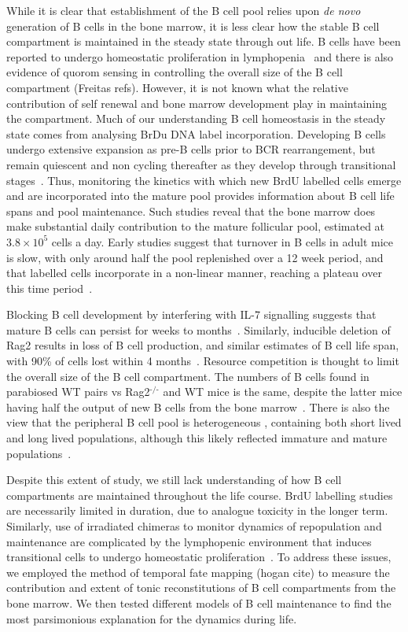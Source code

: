 \documentclass[12pt]{article}
\newcommand{\superscript}[1]{\ensuremath{^{\textrm{#1}}}} %
\newcommand{\red}[1]{{\color{red}{#1}}}
\newcommand{\scinot}[2]{\ensuremath{#1 \times 10^{#2}}}
\begin{document}
While it is clear that establishment of the B cell pool relies upon \textit{de novo} generation of B cells in the bone marrow, it is less clear how the stable B cell compartment is maintained in the steady state through out life. B cells have been reported to undergo homeostatic proliferation in lymphopenia~\citep{MeyerBahlburg:2008bc, Cabatingan:2002fm} and there is also evidence of quorom sensing in controlling the overall size of the B cell compartment (Freitas refs). However, it is not known what the relative contribution of self renewal and bone marrow development play in maintaining the compartment. Much of our understanding B cell homeostasis in the steady state comes from analysing BrDu DNA label incorporation. Developing B cells undergo extensive expansion as pre-B cells prior to BCR rearrangement, but remain quiescent and non cycling thereafter  as they develop through transitional stages~\citep{Srivastava:2005jja}. Thus, monitoring the kinetics with which new BrdU labelled cells emerge and are incorporated into the mature pool provides information about B cell life spans and pool maintenance. Such studies reveal that the bone marrow does make substantial daily contribution to the mature follicular pool, estimated at \scinot{3.8}{5} cells a day. Early studies suggest that turnover in B cells in adult mice is slow, with only around half the pool replenished over a 12 week period, and that labelled cells incorporate in a non-linear manner, reaching a plateau over this time period~\citep{Forster:1990tl, Fulcher:1997dr}. 

Blocking B cell development by interfering with IL-7 signalling suggests that mature B cells can persist for weeks to months~\citep{Grabstein:1993jb}. Similarly, inducible deletion of Rag2 results in loss of B cell production, and similar estimates of B cell life span, with 90\% of cells lost within 4 months~\citep{comp:2001ti}. Resource competition is thought to limit the overall size of the B cell compartment. The numbers of B cells found in parabiosed WT pairs vs Rag2\superscript{-/-} and WT mice is the same, despite the latter mice having half the output of new B cells from the bone marrow~\citep{Agenes:1997hk}. There is also the view that the peripheral B cell pool is heterogeneous \red{isn't this unsurprising since there are multiple subsets?}, containing both short lived and long lived populations, although this likely reflected immature and mature populations~\citep{Fulcher:1997dr}.

Despite this extent of study, we still lack understanding of how B cell compartments are maintained throughout the life course. BrdU labelling studies are necessarily limited in duration, due to analogue toxicity in the longer term. Similarly, use of irradiated chimeras to monitor dynamics of repopulation and maintenance are complicated by the lymphopenic environment that induces transitional cells to undergo homeostatic proliferation~\citep{MeyerBahlburg:2008bc}. To address these issues, we employed the method of temporal fate mapping (hogan cite) to measure the contribution and extent of tonic reconstitutions of B cell compartments from the bone marrow. We then tested different models of B cell maintenance to find the most parsimonious explanation for the dynamics during life. 
\end{document}
